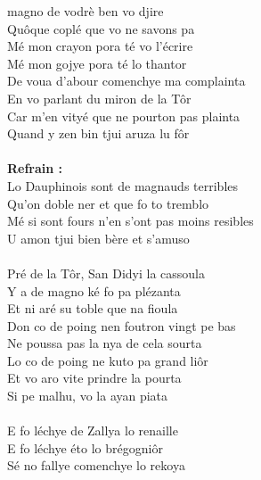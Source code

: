 
 magno de vodrè ben vo djire
\\Quôque coplé que vo ne savons pa
\\Mé mon crayon pora té vo l'écrire
\\Mé mon gojye pora té lo thantor
\\De voua d'abour comenchye ma complainta
\\En vo parlant du miron de la Tôr
\\Car m'en vityé que ne pourton pas plainta
\\Quand y zen bin tjui aruza lu fôr
\\\\\textbf{Refrain :}
\\Lo Dauphinois sont de magnauds terribles
\\Qu'on doble ner et que fo to tremblo
\\Mé si sont fours n'en s'ont pas moins resibles
\\U amon tjui bien bère et s'amuso
\\\\Pré de la Tôr, San Didyi la cassoula
\\Y a de magno ké fo pa plézanta
\\Et ni aré su toble que na fioula
\\Don co de poing nen foutron vingt pe bas
\\Ne poussa pas la nya de cela sourta
\\Lo co de poing ne kuto pa grand liôr
\\Et vo aro vite prindre la pourta
\\Si pe malhu, vo la ayan piata
\\\\E fo léchye de Zallya lo renaille
\\E fo léchye éto lo brégogniôr
\\Sé no fallye comenchye lo rekoya
